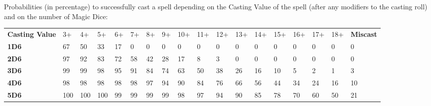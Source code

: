 
Probabilities (in percentage) to successfully cast a spell depending on the Casting Value of the spell (after any modifiers to the casting roll) and on the number of Magic Dice:
{
\begin{center}
\setlength{\tabcolsep}{3pt}
\alternaterowcolors\begin{tabular}{M{3cm}*{16}{M{0.58cm}}M{1.5cm}}
\hline
\textbf{Casting Value} & 3+ & 4+ & 5+ & 6+ & 7+ & 8+ & 9+ & 10+ & 11+ & 12+ & 13+ & 14+ & 15+ & 16+ & 17+ & 18+ & \textbf{Miscast} \\
\textbf{1D6} & \num{67} & \num{50} & \num{33} & \num{17} & \num{0} & \num{0} & \num{0} & \num{0} & \num{0} & \num{0} & \num{0} & \num{0} & \num{0} & \num{0} & \num{0} & \num{0} & \num{0} \\
\textbf{2D6} & \num{97} & \num{92} & \num{83} & \num{72} & \num{58} & \num{42} & \num{28} & \num{17} & \num{8} & \num{3} & \num{0} & \num{0} & \num{0} & \num{0} & \num{0} & \num{0} & \num{0} \\
\textbf{3D6} & \num{99} & \num{99} & \num{98} & \num{95} & \num{91} & \num{84} & \num{74} & \num{63} & \num{50} & \num{38} & \num{26} & \num{16} & \num{10} & \num{5} & \num{2} & \num{1} & \num{3} \\
\textbf{4D6} & \num{98} & \num{98} & \num{98} & \num{98} & \num{98} & \num{97} & \num{94} & \num{90} & \num{84} & \num{76} & \num{66} & \num{56} & \num{44} & \num{34} & \num{24} & \num{16} & \num{10} \\
\textbf{5D6} & \num{100} & \num{100} & \num{100} & \num{99} & \num{99} & \num{99} & \num{99} & \num{98} & \num{97} & \num{94} & \num{90} & \num{85} & \num{78} & \num{70} & \num{60} & \num{50} & \num{21} \\
\hline
\end{tabular}
\end{center}
}

\closesummaries
